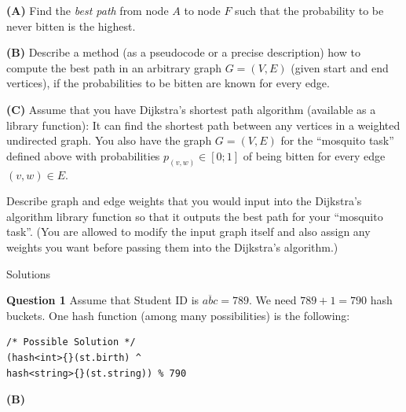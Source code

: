 \documentclass[a4paper,12pt]{article}
\begin{document}
\vspace{5pt}
{\bf (A)} Find the {\em best path} from node $A$ to node $F$ such that
the probability to be never bitten is the highest. 

\vspace{5pt}
{\bf (B)} Describe a method (as a pseudocode or 
a precise description) how to compute the best path
in an arbitrary graph $G=(V,E)$ 
(given start and end vertices), 
if the probabilities to be bitten 
are known for every edge. 


\vspace{5pt} 
{\bf (C)} Assume that you 
have Dijkstra's shortest path algorithm (available as a library function): 
It can find the shortest path between any vertices in a weighted undirected graph.  
You also have the graph $G=(V,E)$ for the ``mosquito task'' defined above 
with probabilities $p_{(v,w)} \in [0;1]$ of being 
bitten for every edge $(v,w) \in E$. 

Describe graph and edge weights that you would input into the Dijkstra's algorithm library function
so that it outputs the best path for your ``mosquito task''. (You are allowed to modify 
the input graph itself and also assign any weights you want before passing them into the Dijkstra's algorithm.)


\newpage

{\Large Solutions}

\vspace{10pt}
{\bf Question 1} Assume that Student ID is $\overline{abc} = 789$. 
We need $789+1 = 790$ hash buckets. One hash function (among many possibilities) is the following:

\begin{Verbatim}[frame=single]
/* Possible Solution */
(hash<int>{}(st.birth) ^ 
hash<string>{}(st.string)) % 790
\end{Verbatim}

\vspace{10pt}
{\bf (B)} 

\end{document}
